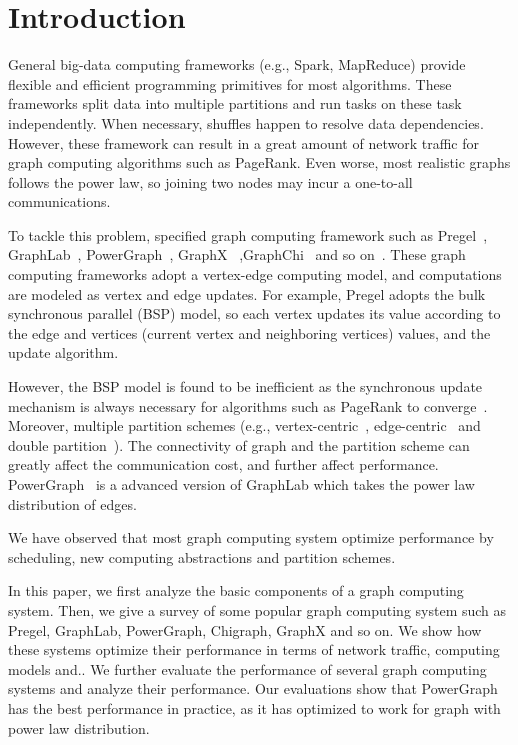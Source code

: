 \documentclass{acm_proc_article}
\newcommand{\eg}[0]{e.g.,}
\begin{document}
\section{Introduction}
General big-data computing frameworks (\eg{} Spark, MapReduce) provide
flexible and efficient programming primitives for most algorithms.
These frameworks split data into multiple partitions and run tasks on
these task independently. When necessary, shuffles happen to resolve data
dependencies.
However, these framework can result in a great amount of network traffic
for graph computing algorithms such as PageRank. Even worse, most realistic graphs
follows the power law, so joining two nodes may incur a one-to-all communications.

To tackle this problem, specified graph computing framework such as
Pregel~\cite{pregel},
GraphLab~\cite{graphlab}, PowerGraph~\cite{powergraph}, GraphX~\cite{graphx}
,GraphChi~\cite{graphchi} and so on~\cite{distributed:graphlab,kineograph}. These graph computing frameworks
adopt a vertex-edge computing model, and computations are modeled
as vertex and edge updates. For example, Pregel adopts the bulk
synchronous parallel (BSP) model, so each vertex updates its value according
to the edge and vertices (current vertex and neighboring vertices) values, and
the update algorithm.

However, the BSP model is found to be inefficient as the synchronous update
mechanism is always necessary for algorithms such as PageRank to
converge~\cite{graphlab}. Moreover, multiple partition schemes (\eg{} vertex-centric~\cite{sigmod10:pregel},
edge-centric~\cite{edge} and double partition~\cite{osdi16}). The connectivity
of graph and the partition scheme can greatly affect the communication cost, and
further affect performance. PowerGraph~\cite{powergraph} is a advanced version of
GraphLab which takes the power law distribution of edges.

We have observed that most graph computing system optimize performance by
scheduling, new computing abstractions and partition schemes.

In this paper, we first analyze the basic components of a graph computing
system. Then, we give a survey of some popular graph computing system
such as Pregel, GraphLab, PowerGraph, Chigraph, GraphX and so on. We show
how these systems optimize their performance in terms of network traffic,
computing models and..
We further evaluate the performance of several graph computing systems
and analyze their performance.
Our evaluations show that PowerGraph has the best performance in practice,
as it has optimized to work for graph with power law distribution.
\end{document}
